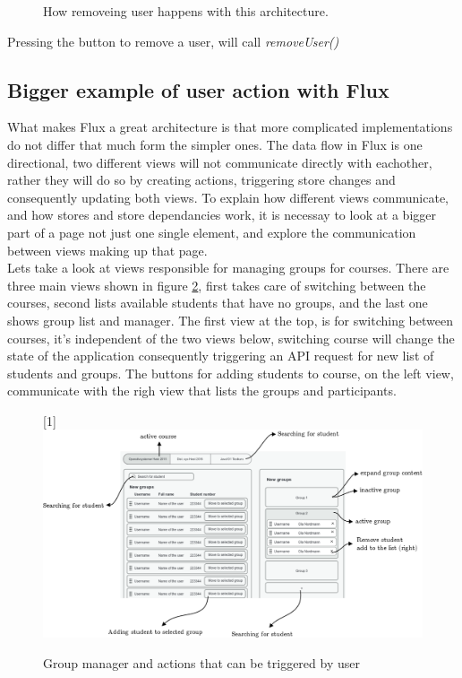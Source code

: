 \begin{figure}[h]
  \scalebox{0.8}{}
  \caption{How removeing user happens with this architecture.}
  \label{fig:simplefluxremoveuser}
\end{figure}

Pressing the button to remove a user, will call \emph{removeUser()} 

\subsection{Bigger example of user action with Flux}\label{sec:advancedfluxexample}
What makes Flux a great architecture is that more complicated implementations do not differ that much form the simpler ones. The data flow in Flux is one directional, two different views will not communicate directly with eachother, rather they will do so by creating actions, triggering store changes and consequently updating both views. To explain how different views communicate, and how stores and store dependancies work, it is necessay to look at a bigger part of a page not just one single element, and explore the communication between views making up that page.
\\Lets take a look at views responsible for managing groups for courses. There are three main views shown in figure \ref{fig:advancedgroupmanager}, first takes care of switching between the courses, second lists available students that have no groups, and the last one shows group list and manager. The first view at the top, is for switching between courses, it's independent of the two views below, switching course will change the state of the application consequently triggering an API request for new list of students and groups. The buttons for adding students to course, on the left view, communicate with the righ view that lists the groups and participants.

\begin{figure}[h]
  \scalebox{1}[1]{{\includegraphics[width=1\linewidth]{graphics/advancedgroupmanager.png}}}
  \caption{Group manager and actions that can be triggered by user}
  \label{fig:advancedgroupmanager}
\end{figure}

